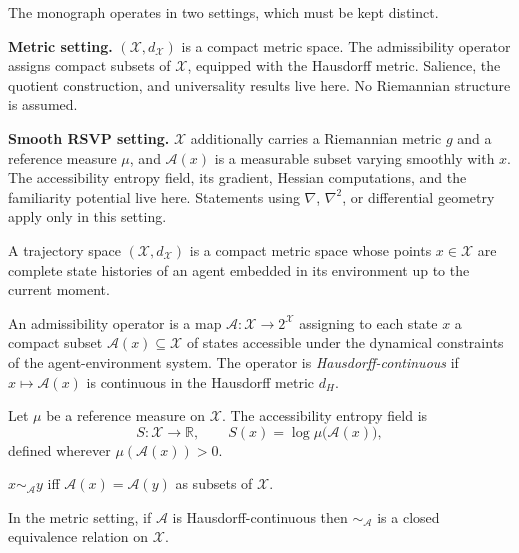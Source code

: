 \documentclass[12pt, a4paper, oneside]{book}
\newcommand{\Adm}{\mathcal{A}}
\newcommand{\X}{\mathcal{X}}
\newcommand{\dH}{d_H}
\newcommand{\SA}{{\sim_{\!\Adm}}}
\newcommand{\Ent}{S}
\begin{document}
The monograph operates in two settings, which must be kept distinct.

\textbf{Metric setting.} $(\X, d_\X)$ is a compact metric space.
The admissibility operator assigns compact subsets of $\X$, equipped
with the Hausdorff metric. Salience, the quotient construction, and
universality results live here. No Riemannian structure is assumed.

\textbf{Smooth RSVP setting.} $\X$ additionally carries a Riemannian
metric $g$ and a reference measure $\mu$, and $\Adm(x)$ is a measurable
subset varying smoothly with $x$. The accessibility entropy field, its
gradient, Hessian computations, and the familiarity potential live here.
Statements using $\nabla$, $\nabla^2$, or differential geometry apply
only in this setting.

\begin{definition}
\label{def:trajspace}
A trajectory space $(\X, d_\X)$ is a compact metric space whose points
$x \in \X$ are complete state histories of an agent embedded in its
environment up to the current moment.
\end{definition}

\begin{definition}
\label{def:admissibility}
An admissibility operator is a map $\Adm : \X \to 2^\X$ assigning to
each state $x$ a compact subset $\Adm(x) \subseteq \X$ of states
accessible under the dynamical constraints of the agent-environment
system. The operator is \emph{Hausdorff-continuous} if $x \mapsto \Adm(x)$
is continuous in the Hausdorff metric $\dH$.
\end{definition}

\begin{definition}
\label{def:entropy}
Let $\mu$ be a reference measure on $\X$.
The accessibility entropy field is
\[
  \Ent : \X \to \mathbb{R}, \qquad \Ent(x) = \log \mu\bigl(\Adm(x)\bigr),
\]
defined wherever $\mu(\Adm(x)) > 0$.
\end{definition}

\begin{definition}
\label{def:admeq}
$x \SA y$ iff $\Adm(x) = \Adm(y)$ as subsets of $\X$.
\end{definition}

\begin{lemma}
\label{lem:closed}
In the metric setting, if $\Adm$ is Hausdorff-continuous then $\SA$ is
a closed equivalence relation on $\X$.
\end{lemma}
\end{document}

